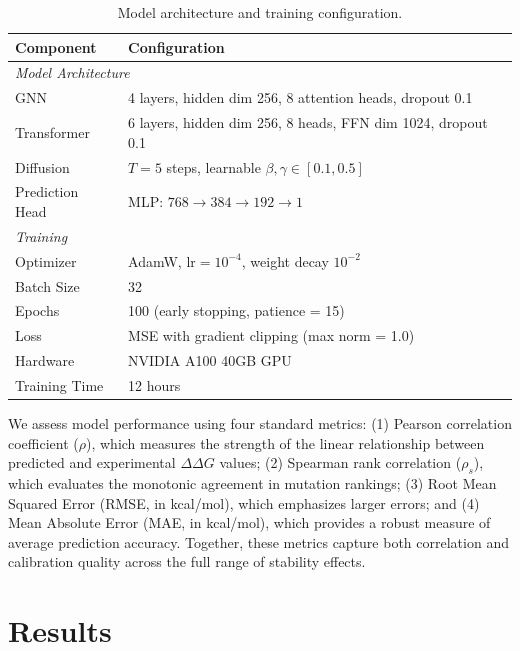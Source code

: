 \documentclass[11pt]{article}
\begin{document}
\begin{table}[htbp]
\centering
\caption{Model architecture and training configuration.}
\label{tab:implementation}
\begin{tabular}{ll}
\toprule
\textbf{Component} & \textbf{Configuration} \\
\midrule
\multicolumn{2}{l}{\textit{Model Architecture}} \\
GNN & 4 layers, hidden dim 256, 8 attention heads, dropout 0.1 \\
Transformer & 6 layers, hidden dim 256, 8 heads, FFN dim 1024, dropout 0.1 \\
Diffusion & $T = 5$ steps, learnable $\beta, \gamma \in [0.1, 0.5]$ \\
Prediction Head & MLP: $768 \rightarrow 384 \rightarrow 192 \rightarrow 1$ \\
\midrule
\multicolumn{2}{l}{\textit{Training}} \\
Optimizer & AdamW, $\text{lr} = 10^{-4}$, weight decay $10^{-2}$ \\
Batch Size & 32 \\
Epochs & 100 (early stopping, patience = 15) \\
Loss & MSE with gradient clipping (max norm = 1.0) \\
Hardware & NVIDIA A100 40GB GPU \\
Training Time & 12 hours \\
\bottomrule
\end{tabular}
\end{table}


We assess model performance using four standard metrics: (1) Pearson
correlation coefficient ($\rho$), which measures the strength of the linear
relationship between predicted and experimental $\Delta \Delta G$ values; (2) Spearman rank
correlation ($\rho_s$), which evaluates the monotonic agreement in mutation
rankings; (3) Root Mean Squared Error (RMSE, in kcal/mol), which emphasizes
larger errors; and (4) Mean Absolute Error (MAE, in kcal/mol), which provides a
robust measure of average prediction accuracy.  Together, these metrics capture
both correlation and calibration quality across the full range of stability
effects.

\section{Results}
\end{document}
